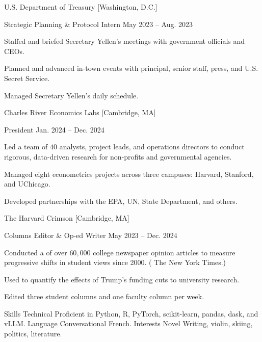 \documentclass[11pt,a4paper]{article}
\begin{document}
\Entry
    {U.S. Department of Treasury}
    [Washington, D.C.]
    {
        \Position
            {Strategic Planning \& Protocol Intern}
            {May 2023 -- Aug. 2023}
            {
                \item Staffed and briefed Secretary Yellen's meetings with government officials and CEOs.
                \item Planned and advanced in-town events with principal, senior staff, press, and U.S. Secret Service.
                \item Managed Secretary Yellen's daily schedule.
            }
    }
\Entry
    {Charles River Economics Labs}
    [Cambridge, MA]
    {
        \Position
            {President}
            {Jan. 2024 -- Dec. 2024}
            {
                \item Led a team of $40$ analysts, project leads, and operations directors to conduct rigorous, data-driven research for non-profits and governmental agencies.
                \item Managed eight econometrics projects across three campuses: Harvard, Stanford, and UChicago.
                \item Developed partnerships with the EPA, UN, State Department, and others.
            }
    }
\Entry
    {The Harvard Crimson}
    [Cambridge, MA]
    {
        \Position
            {Columns Editor \& Op-ed Writer}
            {May 2023 -- Dec. 2024}
            {
                \item Conducted a  of over $60,000$ college newspaper opinion articles to measure progressive shifts in student views since 2000. ( The New York Times.)
                \item Used  to quantify the effects of Trump's funding cuts to university research.
                \item Edited three student columns and one faculty column per week.
            }
    }
\SectionHeader
    {Skills}
\SkillEntry
    {Technical}
    {Proficient in Python, R, PyTorch, scikit-learn, pandas, dask, and vLLM.}
\SkillEntry
    {Language}
    {Conversational French.}
\SkillEntry
    {Interests}
    {Novel Writing, violin, skiing, politics, literature.}
\end{document}
